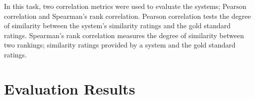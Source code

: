 \documentclass[11pt]{article}
\begin{document}
In this task, two correlation metrics were used to evaluate the systems; Pearson correlation and Spearman's rank correlation.  Pearson correlation tests the degree of similarity between the system's similarity ratings and the gold standard ratings. Spearman's rank correlation measures the degree of similarity between two rankings; similarity ratings provided by a system and the gold standard
ratings.

\begin{table}[hr]
\begin{center}
\end{center}
\caption{\label{table:results-s2p-train} Sentence2phrase subtask scores for the training data.}
\end{table}




\section{Evaluation Results}
\label{evaluation}
\end{document}
